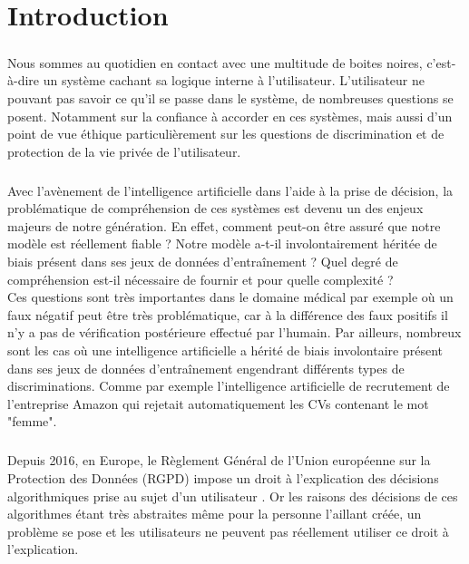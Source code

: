 \chapter*{Introduction}
\label{chap:introduction}
\vspace{5mm}
\paragraph{}Nous sommes au quotidien en contact avec une multitude de boites noires, c’est-à-dire un système cachant sa logique interne à l’utilisateur. L’utilisateur ne pouvant pas savoir ce qu’il se passe dans le système, de nombreuses questions se posent. Notamment sur la confiance à accorder en ces systèmes, mais aussi d’un point de vue éthique particulièrement sur les questions de discrimination et de protection de la vie privée de l’utilisateur.

\paragraph{}Avec l’avènement de l’intelligence artificielle dans l’aide à la prise de décision, la problématique de compréhension de ces systèmes est devenu un des enjeux majeurs de notre génération. En effet, comment peut-on être assuré que notre modèle est réellement fiable ? Notre modèle a-t-il involontairement héritée de biais présent dans ses jeux de données d'entraînement ? Quel degré de compréhension est-il nécessaire de fournir et pour quelle complexité ?\\
Ces questions sont très importantes dans le domaine médical par exemple où un faux négatif peut être très problématique, car à la différence des faux positifs il n'y a pas de vérification postérieure effectué par l'humain. Par ailleurs, nombreux sont les cas où une intelligence artificielle a hérité de biais involontaire présent dans ses jeux de données d'entraînement engendrant différents types de discriminations. Comme par exemple l'intelligence artificielle de recrutement de l'entreprise Amazon qui rejetait automatiquement les CVs contenant le mot "femme"\cite{amazonAi}.

\paragraph{}Depuis 2016, en Europe, le Règlement Général de l'Union européenne sur la Protection des Données (RGPD) impose un droit à l'explication des décisions algorithmiques prise au sujet d'un utilisateur \cite{RGPDexplanRight}. Or les raisons des décisions de ces algorithmes étant très abstraites même pour la personne l'aillant créée, un problème se pose et les utilisateurs ne peuvent pas réellement utiliser ce droit à l'explication.

